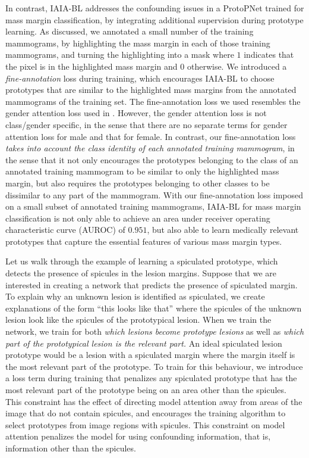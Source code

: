 \documentclass[11pt]{article}
\begin{document}
In contrast, IAIA-BL addresses the confounding issues in a ProtoPNet trained for mass margin classification, by integrating additional supervision during prototype learning. As discussed, we annotated a small number of the training mammograms, by highlighting the mass margin in each of those training mammograms, and turning the highlighting into a mask where $1$ indicates that the pixel is in the highlighted mass margin and $0$ otherwise. We introduced a \textit{fine-annotation} loss during training, which encourages IAIA-BL to choose prototypes that are similar to the highlighted mass margins from the annotated mammograms of the training set. The fine-annotation loss we used resembles the gender attention loss used in \cite{tang2020mitigating}. However, the gender attention loss is not class/gender specific, in the sense that there are no separate terms for gender attention loss for male and that for female. In contrast, our fine-annotation loss \textit{takes into account the class identity of each annotated training mammogram}, in the sense that it not only encourages the prototypes belonging to the class of an annotated training mammogram to be similar to only the highlighted mass margin, but also requires the prototypes belonging to other classes to be dissimilar to any part of the mammogram. With our fine-annotation loss imposed on a small subset of annotated training mammograms, IAIA-BL for mass margin classification is not only able to achieve an area under receiver operating characteristic curve (AUROC) of $0.951$, but also able to learn medically relevant prototypes that capture the essential features of various mass margin types.

Let us walk through the example of learning a spiculated prototype, which detects the presence of spicules in the lesion margins. Suppose that we are interested in creating a network that predicts the presence of spiculated margin. To explain why an unknown lesion is identified as spiculated, we create explanations of the form ``this looks like that'' where the spicules of the unknown lesion look like the spicules of the prototypical lesion. When we train the network, we train for both \textit{which lesions become prototype lesions} as well as \textit{which part of the prototypical lesion is the relevant part.} An ideal spiculated lesion prototype would be a lesion with a spiculated margin where the margin itself is the most relevant part of the prototype. To train for this behaviour, we introduce a loss term during training that penalizes any spiculated prototype that has the most relevant part of the prototype being on an area other than the spicules. This constraint has the effect of directing model attention away from areas of the image that do not contain spicules, and encourages the training algorithm to select prototypes from image regions with spicules. This constraint on model attention penalizes the model for using confounding information, that is, information other than the spicules.
\end{document}
